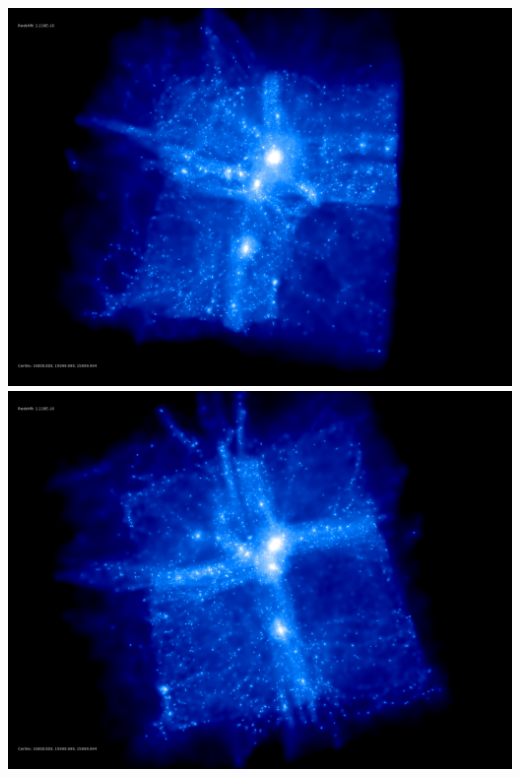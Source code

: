 \includegraphics[scale=0.1]{stages_20/rotate_00074.jpg} 
\includegraphics[scale=0.1]{stages_20/rotate_00131.jpg}

